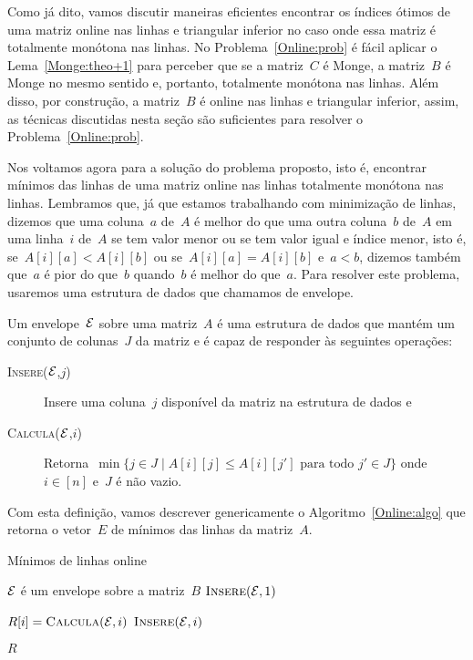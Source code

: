 Como já dito, vamos discutir maneiras eficientes encontrar os índices ótimos de uma matriz online nas linhas e triangular inferior no caso onde essa matriz é totalmente monótona nas linhas. No Problema~\ref{Online:prob} é fácil aplicar o Lema~\ref{Monge:theo+1} para perceber que se a matriz~$C$ é Monge, a matriz~$B$ é Monge no mesmo sentido e, portanto, totalmente monótona nas linhas. Além disso, por construção, a matriz~$B$ é online nas linhas e triangular inferior, assim, as técnicas discutidas nesta seção são suficientes para resolver o Problema~\ref{Online:prob}.

Nos voltamos agora para a solução do problema proposto, isto é, encontrar mínimos das linhas de uma matriz online nas linhas totalmente monótona nas linhas. Lembramos que, já que estamos trabalhando com minimização de linhas, dizemos que uma coluna~$a$ de~$A$ é melhor do que uma outra coluna~$b$ de~$A$ em uma linha~$i$ de~$A$ se tem valor menor ou se tem valor igual e índice menor, isto é, se~$A[i][a] < A[i][b]$ ou se~$A[i][a] = A[i][b]$ e~$a < b$, dizemos também que~$a$ é pior do que~$b$ quando~$b$ é melhor do que~$a$. Para resolver este problema, usaremos uma estrutura de dados que chamamos de envelope.

\begin{defi}
Um envelope~$\mathcal{E}$ sobre uma matriz~$A$ é uma estrutura de dados que mantém um conjunto de colunas~$J$ da matriz e é capaz de responder às seguintes operações:

\begin{description}
    \item[\textsc{Insere}($\mathcal{E}$,$j$)] Insere uma coluna~$j$ disponível da matriz na estrutura de dados e
    \item[\textsc{Calcula}($\mathcal{E}$,$i$)] Retorna~$\min\{j \in J \mid A[i][j] \leq A[i][j'] \text{ para todo } j' \in J\}$ onde~$i \in [n]$ e~$J$ é não vazio.
\end{description}
\end{defi}

Com esta definição, vamos descrever genericamente o Algoritmo~\ref{Online:algo} que retorna o vetor~$E$ de mínimos das linhas da matriz~$A$.

\begin{algorithm}[h]
\caption{Mínimos de linhas online}
\label{Online:algo}
\begin{algorithmic}[1]
    \State $\mathcal{E}$ é um envelope sobre a matriz~$B$
    \State $\textsc{Insere}(\mathcal{E},1)$

     \label{Online:algo:loop}
        \State $R[i] = \textsc{Calcula}(\mathcal{E},i)$
        \State $\textsc{Insere}(\mathcal{E},i)$
    \EndFor

    \State \Return $R$
\EndFunction
\end{algorithmic}
\end{algorithm}

